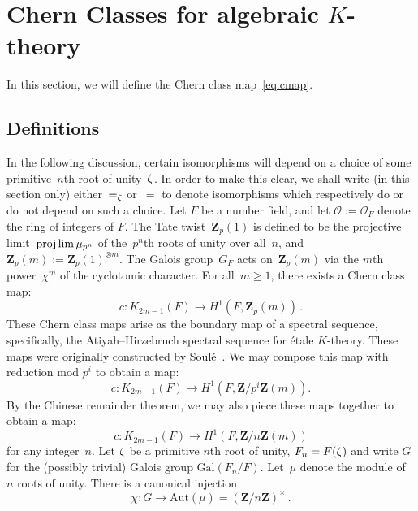 \documentclass[12pt,reqno]{amsart}
\theoremstyle{definition}
\newcommand{\changed}[1]{{#1}}
\def\Z{\mathbf Z}   %
\def\ii{i}
\def\nn{n}
\def\Gal{\mathrm{Gal}}
\def\OL{\mathcal{O}}
\begin{document}
\section{Chern Classes for algebraic 
\texorpdfstring{$K$}{K}-theory}
\label{sec.chern}

In this section,  we will define the Chern class map~\eqref{eq.cmap}.

\subsection{Definitions}
\label{sub.definitions.chern}

In the following discussion,  \changed{certain isomorphisms
will depend on a choice of some primitive~$\nn$th root of unity~$\zeta$. In order to make
this clear, we shall write (in this section only) either~$=_{\zeta}$ or~$=$ to denote
isomorphisms which respectively do or do not depend on such a choice.}
Let $F$ be a number field, and let $\OL:=\OL_F$ denote the ring of integers 
of $F$. \changed{The Tate twist~$\Z_p(1)$ is defined to be the projective
  limit~$\projlim \mu_{p^n}$ of the~$p^n$th roots
of unity over all~$n$,  and $\Z_p(m):= \Z_p(1)^{\otimes m}$.}
The Galois
group~$G_F$ acts \changed{on~$\Z_p(m)$} via the $m$th power~$\chi^m$ of the cyclotomic character.
For all~$m\ge1$,  there exists a Chern class 
map:
$$
c: K_{2m-1}(F) \rightarrow H^1(F,\Z_p(m))\,.
$$
These Chern class maps arise as the boundary map of a spectral sequence, 
specifically, the Atiyah--Hirzebruch spectral sequence for 
\'etale $K$-theory. These maps were originally constructed by 
Soul\'e~\cite[Section~II]{Soule2}.  
We may compose this map with reduction mod $p^\ii$ to obtain a map:
$$
c: K_{2m-1}(F) \rightarrow H^1(F,\Z/p^\ii \Z(m)).
$$
By the Chinese remainder theorem, we may also piece these maps together 
to obtain a map:
$$
c: K_{2m-1}(F) \rightarrow H^1(F,\Z/\nn\Z(m) )
$$
for any integer~$\nn$.
Let $\zeta$ be a primitive $\nn$th root of unity, $F_\nn=F(\z)$ and write $G$ 
for the (possibly trivial) Galois group $\Gal(F_\nn/F)$. Let~$\mu$ denote 
the module of~$\nn$ roots of unity. There is a canonical injection
$$
\chi: G \rightarrow  \mathrm{Aut}(\changed{\mu}) = (\Z/\nn \Z )^{\times} \,.
$$
\end{document}
